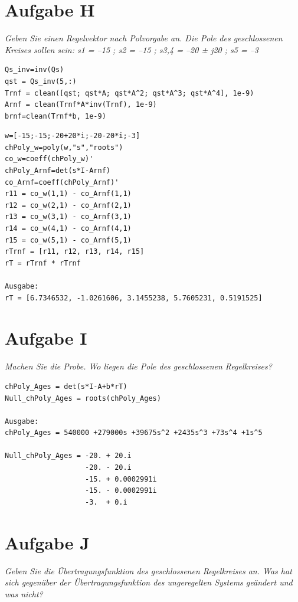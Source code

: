 \section{Aufgabe H}
\textit{Geben Sie einen Regelvektor nach Polvorgabe an. Die Pole des geschlossenen Kreises sollen sein:
s1 = –15 ; s2 = –15 ; s3,4 = –20 ± j20 ; s5 = –3}

\noindent 
\begin{lstlisting}[caption = Transformation in RNF, captionpos = b, label = lst:example]
Qs_inv=inv(Qs)
qst = Qs_inv(5,:)
Trnf = clean([qst; qst*A; qst*A^2; qst*A^3; qst*A^4], 1e-9)
Arnf = clean(Trnf*A*inv(Trnf), 1e-9)
brnf=clean(Trnf*b, 1e-9)\end{lstlisting}

\begin{lstlisting}[caption = Polvorgabe, captionpos = b, label = lst:example]
w=[-15;-15;-20+20*i;-20-20*i;-3]       
chPoly_w=poly(w,"s","roots")            
co_w=coeff(chPoly_w)'                   
chPoly_Arnf=det(s*I-Arnf)
co_Arnf=coeff(chPoly_Arnf)'
r11 = co_w(1,1) - co_Arnf(1,1)
r12 = co_w(2,1) - co_Arnf(2,1)
r13 = co_w(3,1) - co_Arnf(3,1)
r14 = co_w(4,1) - co_Arnf(4,1)
r15 = co_w(5,1) - co_Arnf(5,1)
rTrnf = [r11, r12, r13, r14, r15]
rT = rTrnf * rTrnf

Ausgabe:
rT = [6.7346532, -1.0261606, 3.1455238, 5.7605231, 0.5191525]
\end{lstlisting}


\section{Aufgabe I}
\textit{Machen Sie die Probe. Wo liegen die Pole des geschlossenen Regelkreises?}


\begin{lstlisting}[caption = Pole des geschlossenen Regelkreises, captionpos = b, label = lst:example]
chPoly_Ages = det(s*I-A+b*rT)
Null_chPoly_Ages = roots(chPoly_Ages)
    
Ausgabe:
chPoly_Ages = 540000 +279000s +39675s^2 +2435s^3 +73s^4 +1s^5

Null_chPoly_Ages = -20. + 20.i      
                   -20. - 20.i      
                   -15. + 0.0002991i
                   -15. - 0.0002991i
                   -3.  + 0.i
\end{lstlisting}





\section{Aufgabe J}
\textit{Geben Sie die Übertragungsfunktion des geschlossenen Regelkreises an. Was hat sich gegenüber der Übertragungsfunktion des ungeregelten Systems geändert und was nicht?}
 
